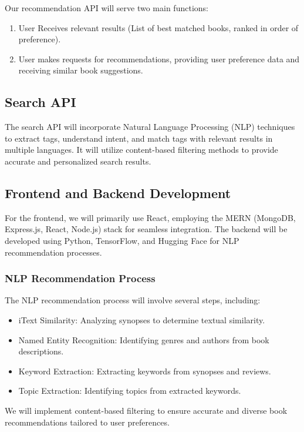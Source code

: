 \documentclass{article}
\begin{document}
Our recommendation API will serve two main functions:
\begin{enumerate}
    \item User Receives relevant results (List of best matched books, ranked in order of preference).
    \item User makes requests for recommendations, providing user preference data and receiving similar book suggestions.
\end{enumerate}

\subsection{Search API}

The search API will incorporate Natural Language Processing (NLP) techniques to extract tags, understand intent, and match tags with relevant results in multiple languages. It will utilize content-based filtering methods to provide accurate and personalized search results.

\subsection{Frontend and Backend Development}

For the frontend, we will primarily use React, employing the MERN (MongoDB, Express.js, React, Node.js) stack for seamless integration. The backend will be developed using Python, TensorFlow, and Hugging Face for NLP recommendation processes.

\subsubsection{NLP Recommendation Process}

The NLP recommendation process will involve several steps, including:
\begin{itemize}
    \item iText Similarity: Analyzing synopses to determine textual similarity.
    \item Named Entity Recognition: Identifying genres and authors from book descriptions.
    \item Keyword Extraction: Extracting keywords from synopses and reviews.
    \item Topic Extraction: Identifying topics from extracted keywords.
\end{itemize}

We will implement content-based filtering to ensure accurate and diverse book recommendations tailored to user preferences.
\end{document}
